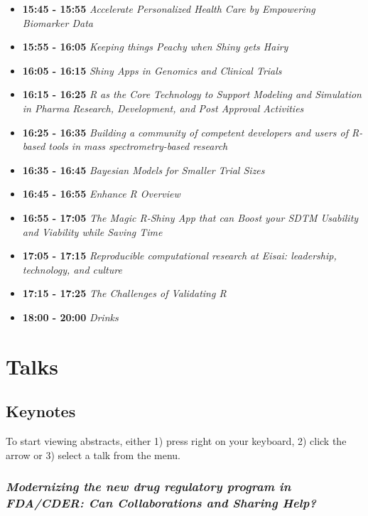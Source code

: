 \documentclass[]{book}
\theoremstyle{definition}
\theoremstyle{definition}
\theoremstyle{definition}
\theoremstyle{remark}
\begin{document}
\begin{itemize}
\item
  \textbf{15:45 - 15:55} \emph{Accelerate Personalized Health Care by
  Empowering Biomarker Data}
\item
  \textbf{15:55 - 16:05} \emph{Keeping things Peachy when Shiny gets
  Hairy}
\item
  \textbf{16:05 - 16:15} \emph{Shiny Apps in Genomics and Clinical
  Trials}
\item
  \textbf{16:15 - 16:25} \emph{R as the Core Technology to Support
  Modeling and Simulation in Pharma Research, Development, and Post
  Approval Activities}
\item
  \textbf{16:25 - 16:35} \emph{Building a community of competent
  developers and users of R-based tools in mass spectrometry-based
  research}
\item
  \textbf{16:35 - 16:45} \emph{Bayesian Models for Smaller Trial Sizes}
\item
  \textbf{16:45 - 16:55} \emph{Enhance R Overview}
\item
  \textbf{16:55 - 17:05} \emph{The Magic R-Shiny App that can Boost your
  SDTM Usability and Viability while Saving Time}
\item
  \textbf{17:05 - 17:15} \emph{Reproducible computational research at
  Eisai: leadership, technology, and culture}
\item
  \textbf{17:15 - 17:25} \emph{The Challenges of Validating R}
\item
  \textbf{18:00 - 20:00} \emph{Drinks}
\end{itemize}

\hypertarget{part-talks}{%
\part{Talks}\label{part-talks}}

\hypertarget{keynotes}{%
\chapter{Keynotes}\label{keynotes}}

To start viewing abstracts, either 1) press right on your keyboard, 2)
click the arrow or 3) select a talk from the menu.

\hypertarget{modernizing-the-new-drug-regulatory-program-in-fdacder-can-collaborations-and-sharing-help}{%
\section{\texorpdfstring{\emph{Modernizing the new drug regulatory
program in FDA/CDER: Can Collaborations and Sharing
Help?}}{Modernizing the new drug regulatory program in FDA/CDER: Can Collaborations and Sharing Help?}}\label{modernizing-the-new-drug-regulatory-program-in-fdacder-can-collaborations-and-sharing-help}}
\end{document}
